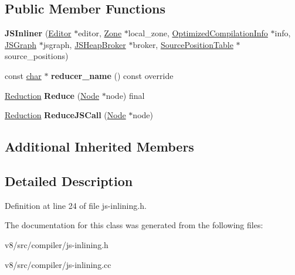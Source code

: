 \subsection*{Public Member Functions}
\begin{DoxyCompactItemize}
\item 
\mbox{\label{classv8_1_1internal_1_1compiler_1_1JSInliner_ab9784032986d9fd82ae6fdfe00f18f2b}} 
{\bfseries J\+S\+Inliner} (\mbox{\hyperlink{classv8_1_1internal_1_1compiler_1_1AdvancedReducer_1_1Editor}{Editor}} $\ast$editor, \mbox{\hyperlink{classv8_1_1internal_1_1Zone}{Zone}} $\ast$local\+\_\+zone, \mbox{\hyperlink{classv8_1_1internal_1_1OptimizedCompilationInfo}{Optimized\+Compilation\+Info}} $\ast$info, \mbox{\hyperlink{classv8_1_1internal_1_1compiler_1_1JSGraph}{J\+S\+Graph}} $\ast$jsgraph, \mbox{\hyperlink{classv8_1_1internal_1_1compiler_1_1JSHeapBroker}{J\+S\+Heap\+Broker}} $\ast$broker, \mbox{\hyperlink{classv8_1_1internal_1_1compiler_1_1SourcePositionTable}{Source\+Position\+Table}} $\ast$source\+\_\+positions)
\item 
\mbox{\label{classv8_1_1internal_1_1compiler_1_1JSInliner_ad5b24ae867c13e0a329e904f80cc77d0}} 
const \mbox{\hyperlink{classchar}{char}} $\ast$ {\bfseries reducer\+\_\+name} () const override
\item 
\mbox{\label{classv8_1_1internal_1_1compiler_1_1JSInliner_a2107409713e64e84dc797fa5ca80f910}} 
\mbox{\hyperlink{classv8_1_1internal_1_1compiler_1_1Reduction}{Reduction}} {\bfseries Reduce} (\mbox{\hyperlink{classv8_1_1internal_1_1compiler_1_1Node}{Node}} $\ast$node) final
\item 
\mbox{\label{classv8_1_1internal_1_1compiler_1_1JSInliner_a1324c04be61ba4f42912e35f6c81a0f5}} 
\mbox{\hyperlink{classv8_1_1internal_1_1compiler_1_1Reduction}{Reduction}} {\bfseries Reduce\+J\+S\+Call} (\mbox{\hyperlink{classv8_1_1internal_1_1compiler_1_1Node}{Node}} $\ast$node)
\end{DoxyCompactItemize}
\subsection*{Additional Inherited Members}


\subsection{Detailed Description}


Definition at line 24 of file js-\/inlining.\+h.



The documentation for this class was generated from the following files\+:\begin{DoxyCompactItemize}
\item 
v8/src/compiler/js-\/inlining.\+h\item 
v8/src/compiler/js-\/inlining.\+cc\end{DoxyCompactItemize}
